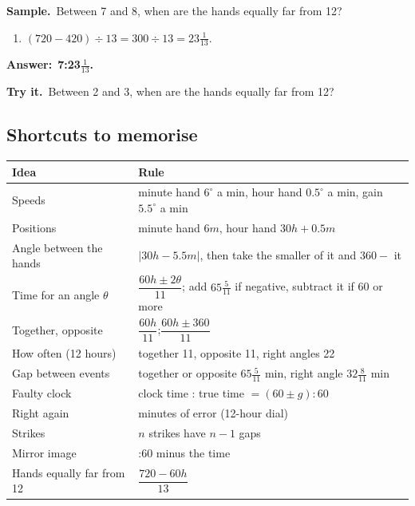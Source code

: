 \documentclass[11pt,a4paper]{article}
\let\oldsubsection\subsection
\renewcommand{\subsection}{\needspace{9\baselineskip}\oldsubsection}
\newif\ifkeepsamp
\newcommand{\ans}[1]{\par\nopagebreak\noindent\textbf{\color{ember}Answer:}\ \textbf{#1}\par}
\newcommand{\samp}{\ifkeepsamp\needspace{4\baselineskip}\fi\textbf{\color{ember}Sample.}\ }
\newcommand{\tryit}[1]{\textbf{\color{ember}Try it.}\ #1}
\begin{document}
\samp Between 7 and 8, when are the hands equally far from 12?
\begin{enumerate}
\item $(720 - 420) \div 13 = 300 \div 13 = 23\tfrac1{13}$.
\end{enumerate}
\ans{7:23$\tfrac1{13}$.}

\tryit Between 2 and 3, when are the hands equally far from 12?

\subsection*{Shortcuts to memorise}
\begin{center}\small\renewcommand{\arraystretch}{1.9}\setlength{\tabcolsep}{8pt}
\begin{tabularx}{\linewidth}{@{}>{\raggedright\arraybackslash}X>{\raggedright\arraybackslash}X@{}}
\toprule
\textbf{\color{slate}Idea} & \textbf{\color{slate}Rule} \\ \midrule
Speeds & minute hand $6^\circ$ a min, hour hand $0.5^\circ$ a min, gain $5.5^\circ$ a min \\
Positions & minute hand $6m$, hour hand $30h + 0.5m$ \\
Angle between the hands & $|30h - 5.5m|$, then take the smaller of it and $360 -$ it \\
Time for an angle $\theta$ & $\dfrac{60h \pm 2\theta}{11}$; add $65\frac5{11}$ if negative, subtract it if 60 or more \\
Together, opposite & $\dfrac{60h}{11}$;\quad $\dfrac{60h \pm 360}{11}$ \\
How often (12 hours) & together 11, opposite 11, right angles 22 \\
Gap between events & together or opposite $65\frac5{11}$ min, right angle $32\frac8{11}$ min \\
Faulty clock & clock time : true time $=(60 \pm g) : 60$ \\
Right again & 720 minutes of error (12-hour dial) \\
Strikes & $n$ strikes have $n - 1$ gaps \\
Mirror image & 11:60 minus the time \\
Hands equally far from 12 & $\dfrac{720 - 60h}{13}$ \\
\bottomrule
\end{tabularx}\end{center}
\end{document}
